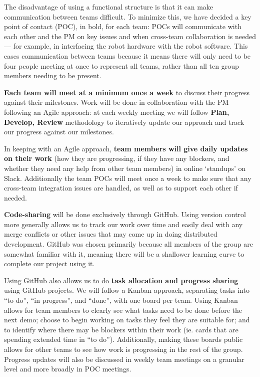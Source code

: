 \documentclass{article}
\begin{document}
The disadvantage of using a functional structure is that it can make communication between teams difficult. To minimize this, we have decided a key point of contact (POC), in bold, for each team: POCs will communicate with each other and the PM on key issues and when cross-team collaboration is needed --- for example, in interfacing the robot hardware with the robot software. This eases communication between teams because it means there will only need to be four people meeting at once to represent all teams, rather than all ten group members needing to be present.

{\bf Each team will meet at a minimum once a week} to discuss their progress against their milestones. Work will be done in collaboration with the PM following an Agile approach: at each weekly meeting we will follow {\bf Plan, Develop, Review} methodology to iteratively update our approach and track our progress against our milestones.

In keeping with an Agile approach, {\bf team members will give daily updates on their work} (how they are progressing, if they have any blockers, and whether they need any help from other team members) in online `standups' on Slack. Additionally the team POCs will meet once a week to make sure that any cross-team integration issues are handled, as well as to support each other if needed. 

{\bf Code-sharing} will be done exclusively through GitHub. Using version control more generally allows us to track our work over time and easily deal with any merge conflicts or other issues that may come up in doing distributed development. GitHub was chosen primarily because all members of the group are somewhat familiar with it, meaning there will be a shallower learning curve to complete our project using it. 

Using GitHub also allows us to do {\bf task allocation and progress sharing} using GitHub projects. We will follow a Kanban approach, separating tasks into ``to do'', ``in progress'', and ``done'', with one board per team. Using Kanban allows for team members to clearly see what tasks need to be done before the next demo; choose to begin working on tasks they feel they are suitable for; and to identify where there may be blockers within their work (ie. cards that are spending extended time in ``to do''). Additionally, making these boards public allows for other teams to see how work is progressing in the rest of the group. Progress updates will also be discussed in weekly team meetings on a granular level and more broadly in POC meetings.
\end{document}
